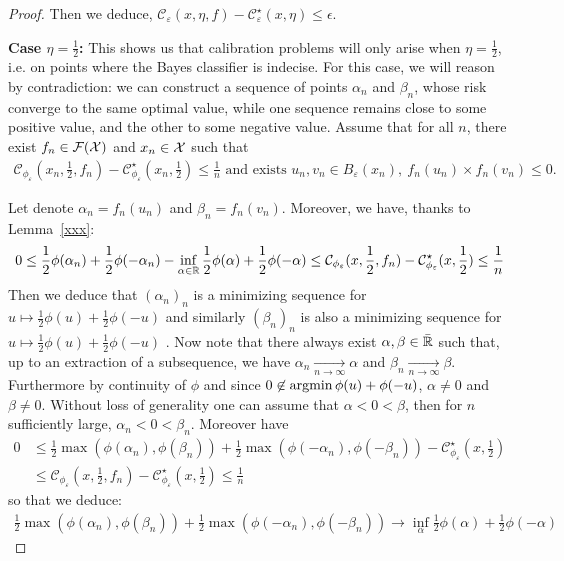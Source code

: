 \begin{proof}
    
    Then we deduce, $\mathcal{C}_{\varepsilon}(x,\eta,f) - \mathcal{C}_{\varepsilon}^\star(x,\eta)\leq \epsilon$.
    
    \medskip
    
    \textbf{Case $\eta=\frac12$:} This shows us that calibration problems will only arise when $\eta = \frac{1}{2}$, i.e. on points where the Bayes classifier is indecise. For this case, we will reason by contradiction: we can construct a sequence of points $\alpha_n$ and $\beta_n$, whose risk converge to the same optimal value, while one sequence remains close to some positive value, and the other to some negative value. Assume that for all $n$, there exist $f_n\in\mathcal{F}(\mathcal{X})$ and $x_n\in\mathcal{X}$ such that 
    \begin{align*}
        \mathcal{C}_{\phi_\varepsilon}(x_n,\frac12,f_n) - \mathcal{C}_{\phi_\varepsilon}^\star(x_n,\frac12)\leq \frac1n\text{ and exists $u_n,v_n\in B_\varepsilon(x_n)$},~ f_n(u_n)\times f_n(v_n)\leq 0.
    \end{align*}
    
    Let denote $\alpha_n = f_n(u_n)$ and $\beta_n = f_n(v_n)$. %
    Moreover, we have, thanks to Lemma~\ref{xxx}:
    \begin{align*}
      0\leq \frac12 \phi(\alpha_n) +  \frac12 \phi(-\alpha_n)- \inf_{\alpha\in\mathbb{R}}\frac12 \phi(\alpha)+\frac12\phi(-\alpha)\leq \mathcal{C}_{\phi_\varepsilon}(x,\frac12,f_n) - \mathcal{C}_{\phi_\varepsilon}^\star(x,\frac12)\leq \frac1n
    \end{align*}
    Then we deduce that $(\alpha_n)_n$ is a minimizing sequence for  $u\mapsto\frac12\phi(u)+\frac12\phi(-u)$ and similarly $(\beta_n)_n$ is also a minimizing sequence for  $u\mapsto\frac12\phi(u)+\frac12\phi(-u)$ . Now note that there always exist $\alpha, \beta\in \bar{\mathbb{R}}$ such that, up to an extraction of a subsequence, we have $\alpha_n\xrightarrow[n\to\infty]{} \alpha$ and $\beta_n \xrightarrow[n\to\infty]{} \beta$. Furthermore by continuity of $\phi$ and since $0\not\in\operatorname*{argmin}\phi(u)+\phi(-u)$, $\alpha\neq0$ and $\beta\neq 0$. Without loss of generality one can assume that $\alpha<0<\beta$, then for $n$ sufficiently large, $\alpha_n<0<\beta_n$. Moreover have 
    \begin{align*}
         0&\leq\frac12\max\left(\phi(\alpha_n),\phi(\beta_n)\right)+\frac12\max\left(\phi(-\alpha_n),\phi(-\beta_n)\right)- \mathcal{C}^\star_{\phi_\varepsilon}(x,\frac12)\\
         &\leq \mathcal{C}_{\phi_\varepsilon}(x,\frac12,f_n) - \mathcal{C}_{\phi_\varepsilon}^\star(x,\frac12)\leq \frac1n
    \end{align*}
    so that we deduce:
    \begin{align}
    \label{eq:limitalphabeta}
     \frac12\max\left(\phi(\alpha_n),\phi(\beta_n)\right)+\frac12\max\left(\phi(-\alpha_n),\phi(-\beta_n)\right)\longrightarrow \inf_\alpha \frac12\phi(\alpha)+\frac12\phi(-\alpha) 
    \end{align}
    

\end{proof}
